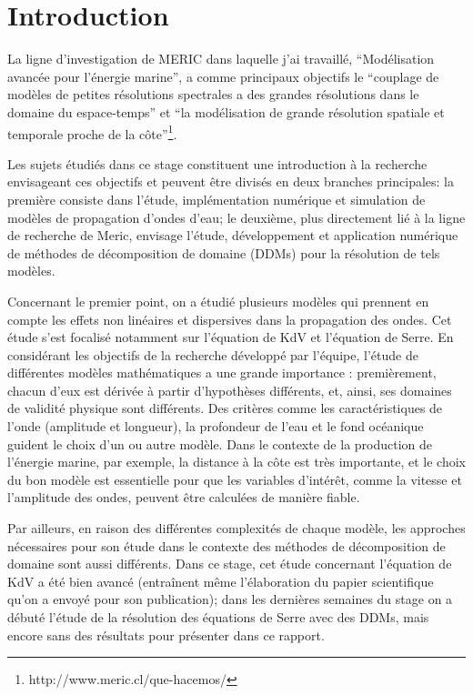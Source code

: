 \section{Introduction}

\indent La ligne d'investigation de MERIC dans laquelle j'ai travaillé, ``Modélisation avancée pour l'énergie marine'', a comme principaux objectifs le ``couplage de modèles de petites résolutions spectrales a des grandes résolutions dans le domaine du espace-temps'' et ``la modélisation de grande résolution spatiale et temporale proche de la côte''\footnote{http://www.meric.cl/que-hacemos/}.

\indent Les sujets étudiés dans ce stage constituent une introduction à la recherche envisageant ces objectifs et peuvent être divisés en deux branches principales: la première consiste dans l'étude, implémentation numérique et simulation de modèles de propagation d'ondes d'eau; le deuxième, plus directement lié à la ligne de recherche de Meric, envisage l'étude, développement et application numérique de méthodes de décomposition de domaine (DDMs) pour la résolution de tels modèles.

\indent Concernant le premier point, on a étudié plusieurs modèles qui prennent en compte les effets non linéaires et dispersives dans la propagation des ondes. Cet étude s'est focalisé notamment sur l'équation de KdV et l'équation de Serre. En considérant les objectifs de la recherche développé par l'équipe, l'étude de différentes modèles mathématiques a une grande importance : premièrement, chacun d'eux est dérivée à partir d'hypothèses différents, et, ainsi, ses domaines de validité physique sont différents. Des critères comme les caractéristiques de l'onde (amplitude et longueur), la profondeur de l'eau et le fond océanique guident le choix d'un ou autre modèle. Dans le contexte de la production de l'énergie marine, par exemple, la distance à la côte est très importante, et le choix du bon modèle est essentielle pour que les variables d'intérêt, comme la vitesse et l'amplitude des ondes, peuvent être calculées de manière fiable.

\indent Par ailleurs, en raison des différentes complexités de chaque modèle, les approches nécessaires pour son étude dans le contexte des méthodes de décomposition de domaine sont aussi différents. Dans ce stage, cet étude concernant l'équation de KdV a été bien avancé (entraînent même l'élaboration du papier scientifique qu'on a envoyé pour son publication); dans les dernières semaines du stage on a débuté l'étude de la résolution des équations de Serre avec des DDMs, mais encore sans des résultats pour présenter dans ce rapport.

